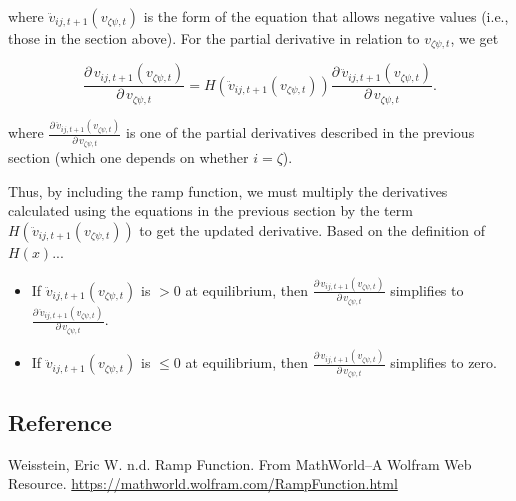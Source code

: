 \noindent where $\ddot{v}_{ij,t+1}(v_{\zeta\psi,t})$ is the form of the equation that
allows negative values (i.e., those in the section above).
For the partial derivative in relation to $v_{\zeta\psi,t}$, we get


\begin{equation*}
    \frac{\partial \, v_{ij,t+1}(v_{\zeta\psi,t})}{\partial \, v_{\zeta\psi,t}} =
        H(\ddot{v}_{ij,t+1}(v_{\zeta\psi,t}))
        \frac{\partial \, \ddot{v}_{ij,t+1}(v_{\zeta\psi,t})}{
            \partial \, v_{\zeta\psi,t} }
\text{.}
\end{equation*}

\noindent where
$\frac{\partial \, \ddot{v}_{ij,t+1}(v_{\zeta\psi,t})}{
\partial \, v_{\zeta\psi,t}}$
is one of the partial derivatives described in the previous section
(which one depends on whether $i = \zeta$).


Thus, by including the ramp function, we must multiply the derivatives
calculated using the equations in the previous section by the term
$H(\ddot{v}_{ij,t+1}(v_{\zeta\psi,t}))$ to get the updated derivative.
Based on the definition of $H(x)$...

\begin{itemize}
    \item If $\ddot{v}_{ij,t+1}(v_{\zeta\psi,t})$ is $> 0$ at equilibrium, then
        $\frac{\partial \, v_{ij,t+1}(v_{\zeta\psi,t})}{
            \partial \, v_{\zeta\psi,t}}$
        simplifies to $\frac{\partial \, \ddot{v}_{ij,t+1}(v_{\zeta\psi,t})}{
            \partial \, v_{\zeta\psi,t}}$.
    \item If $\ddot{v}_{ij,t+1}(v_{\zeta\psi,t})$ is $\le 0$ at equilibrium, then
        $\frac{\partial \, v_{ij,t+1}(v_{\zeta\psi,t})}{
            \partial \, v_{\zeta\psi,t}}$
        simplifies to zero.
\end{itemize}




\subsection*{Reference}

Weisstein, Eric W. n.d. Ramp Function.
From MathWorld--A Wolfram Web Resource.
\url{https://mathworld.wolfram.com/RampFunction.html}
